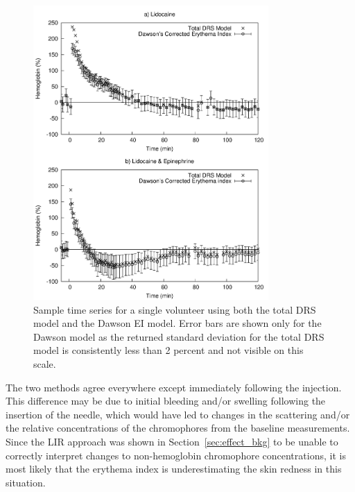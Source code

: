 \begin{figure}
	\centering \includegraphics[width=0.8\textwidth]{figures/p3-lido_epi.png}
	\caption[Hover and figure index text]{\label{fig:p3-lido_epi}Sample time series for a single volunteer using both the total DRS model and the Dawson EI model. Error bars are shown only for the Dawson model as the returned standard deviation for the total DRS model is consistently less than 2 percent and not visible on this scale.}
\end{figure}

The two methods agree everywhere except immediately following the injection. This difference may be due to initial bleeding and/or swelling following the insertion of the needle, which would have led to changes in the scattering and/or the relative concentrations of the chromophores from the baseline measurements. Since the LIR approach was shown in Section~\ref{sec:effect_bkg} to be unable to correctly interpret changes to non-hemoglobin chromophore concentrations, it is most likely that the erythema index is underestimating the skin redness in this situation.

